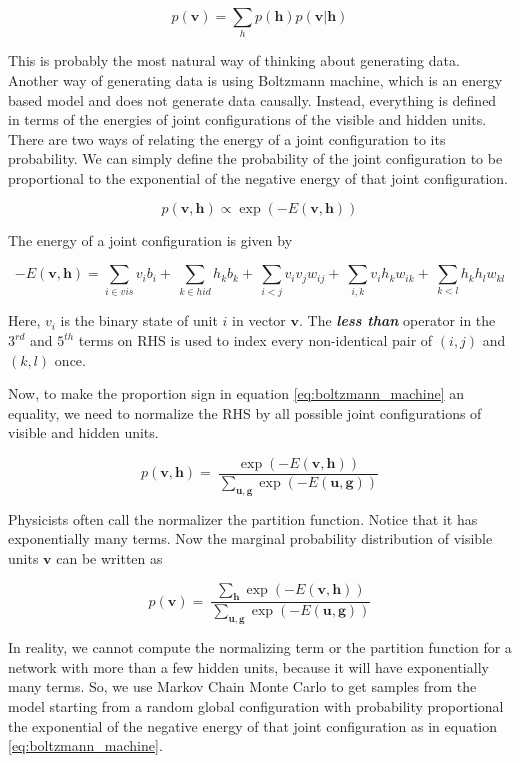 \documentclass{article}
\begin{document}
\begin{equation}
p(\mathbf{v}) = \sum_{h} p(\mathbf{h})p(\mathbf{v|h})
\label{eq:causal_model}
\end{equation}   

This is probably the most natural way of thinking about generating data. Another way of generating data is using Boltzmann machine, which is an energy based model and does not generate data causally. Instead, everything is defined in terms of the energies of joint configurations of the visible and hidden units. There are two ways of relating the energy of a joint configuration to its probability. We can simply define the probability of the joint configuration to be proportional to the exponential of the negative energy of that joint configuration.

\begin{equation}
p(\mathbf{v,h}) \propto \exp(-E(\mathbf{v,h}))
\label{eq:boltzmann_machine}
\end{equation}

\noindent The energy of a joint configuration is given by

\begin{equation}
-E(\mathbf{v,h}) = \sum_{i \in vis} v_{i} b_{i} + \
\sum_{k \in hid} h_{k} b_{k} + \
\sum_{i<j} v_{i} v_{j} w_{ij} + \
\sum_{i,k} v_{i} h_{k} w_{ik} + \
\sum_{k<l} h_{k} h_{l} w_{kl}
\label{eq:joint_energy_bm}
\end{equation}

Here, $v_i$ is the binary state of unit $i$ in vector $\mathbf{v}$. The \textit{\textbf{less than}} operator in the $3^{rd}$ and $5^{th}$ terms on RHS is used to index every non-identical pair of $(i,j)$ and $(k,l)$ once. 

Now, to make the proportion sign in equation \ref{eq:boltzmann_machine} an equality, we need to normalize the RHS by all possible joint configurations of visible and hidden units.

\begin{equation}
p(\mathbf{v,h}) = \
\frac{\exp(-E(\mathbf{v,h}))} {\sum_{\mathbf{u,g}}\exp(-E(\mathbf{u,g}))}
\label{eq:boltzmann_machine_equal}
\end{equation} 

Physicists often call the normalizer the partition function. Notice that it has exponentially many terms. Now the marginal probability distribution of visible units $\mathbf{v}$ can be written as

\begin{equation}
p(\mathbf{v}) = \
\frac{\sum_{\mathbf{h}}\exp(-E(\mathbf{v,h}))} {\sum_{\mathbf{u,g}}\exp(-E(\mathbf{u,g}))}
\label{eq:boltzmann_machine_equal_vis}
\end{equation} 

In reality, we cannot compute the normalizing term or the partition function for a network with more than a few hidden units, because it will have exponentially many terms. So, we use Markov Chain Monte Carlo to get samples from the model starting from a random global configuration with probability proportional the exponential of the negative energy of that joint configuration as in equation \ref{eq:boltzmann_machine}.
\end{document}
